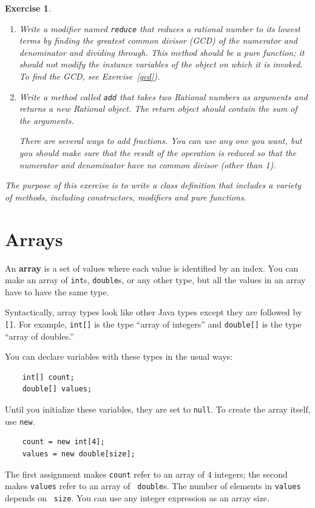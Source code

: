 \documentclass[12pt]{book}
\theoremstyle{exercise}
\newtheorem{exercise}{Exercise}[chapter]
\begin{document}
\begin{exercise}
\begin{enumerate}
\item Write a modifier named {\tt reduce} that reduces a rational
  number to its lowest terms by finding the greatest common divisor
  (GCD) of the numerator and denominator and dividing through.
  This method should be a pure function; it should
  not modify the instance variables of the object on which it is
  invoked.  To find the GCD, see Exercise~\ref{gcd}).

\item Write a method called {\tt add} that takes two Rational
numbers as arguments and returns a new Rational object.  The return
object should contain the sum of the arguments.

There are several ways to add fractions.  You can use any one you
want, but you should make sure that the result of the operation is
reduced so that the numerator and denominator have no common divisor
(other than 1).
\end{enumerate}

The purpose of this exercise is to write a class definition that
includes a variety of methods, including constructors, modifiers and
pure functions.
\end{exercise}




\chapter{Arrays}
\label{chap10}
\label{arrays}

An {\bf array} is a set of values where each value is identified by an
index.  You can make an array of {\tt int}s, {\tt double}s, or any
other type, but all the values in an array have to have the same type.

Syntactically, array types look like other Java types except they are
followed by {\tt []}.  For example, {\tt int[]} is the type ``array of
integers'' and {\tt double[]} is the type ``array of doubles.''

You can declare variables with these types in the usual ways:

\begin{lstlisting}
    int[] count;
    double[] values;
\end{lstlisting}
%
Until you initialize these variables, they are set to {\tt null}.
To create the array itself, use {\tt new}.

\begin{lstlisting}
    count = new int[4];
    values = new double[size];
\end{lstlisting}
%
The first assignment makes {\tt count} refer to an array of 4
integers; the second makes {\tt values} refer to an array of {\tt
double}s.  The number of elements in {\tt values} depends on {\tt
size}.  You can use any integer expression as an array
size.
\end{document}
